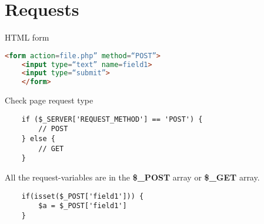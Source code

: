 \documentclass[a4paper]{article}
\begin{document}
\section{Requests}

HTML form

\begin{lstlisting}[language=HTML]
    <form action=file.php” method=“POST”>
    <input type=“text” name=field1>
    <input type=“submit”>
    </form>
\end{lstlisting}

Check page request type

\begin{lstlisting}
    if ($_SERVER['REQUEST_METHOD'] == 'POST') {
        // POST
    } else {
        // GET
    }
\end{lstlisting}

All the request-variables are in the \textbf{\$\_POST} array or  \textbf{\$\_GET} array.

\begin{lstlisting}
    if(isset($_POST['field1'])) {
        $a = $_POST['field1']
    }
\end{lstlisting}
\end{document}
